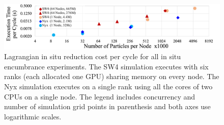 \begin{figure}[!t]
\centering
\includegraphics[width=\linewidth]{Images/InSituCost_Stretch2.pdf}
\vspace{-5mm}
\caption{Lagrangian in situ reduction cost per cycle for all in situ encumbrance experiments. The SW4 simulation executes with six ranks (each allocated one GPU) sharing memory on every node. The Nyx simulation executes on a single rank using all the cores of two CPUs on a single node. The legend includes concurrency and number of simulation grid points in parenthesis and both axes use logarithmic scales.} 
\vspace{-5mm}
\label{fig:insitucost}
\end{figure}
